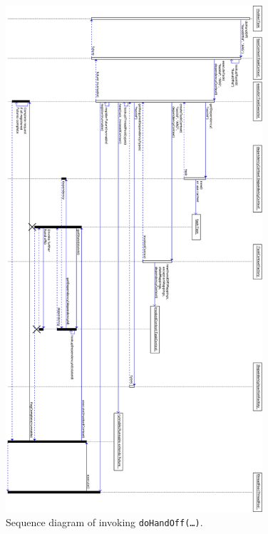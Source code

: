 \documentclass[prodmode]{style/acmlarge}
\begin{document}
\begin{figure}[!t]
\centering
\includegraphics[height=7.4in]{DoContinuationSequenceDiagram}
\caption{Sequence diagram of invoking \texttt{doHandOff(\ldots)}.}
\label{fig:DoContinuationSequenceDiagram}
\end{figure}
\end{document}
